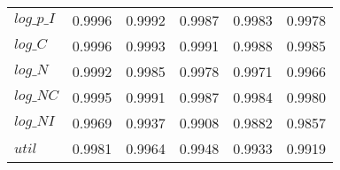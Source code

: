 \begin{center}
\begin{longtable}{lccccc}
$log\_p\_I  $	 & 	     0.9996	 & 	     0.9992	 & 	     0.9987	 & 	     0.9983	 & 	     0.9978 \\ 
$log\_C     $	 & 	     0.9996	 & 	     0.9993	 & 	     0.9991	 & 	     0.9988	 & 	     0.9985 \\ 
$log\_N     $	 & 	     0.9992	 & 	     0.9985	 & 	     0.9978	 & 	     0.9971	 & 	     0.9966 \\ 
$log\_NC    $	 & 	     0.9995	 & 	     0.9991	 & 	     0.9987	 & 	     0.9984	 & 	     0.9980 \\ 
$log\_NI    $	 & 	     0.9969	 & 	     0.9937	 & 	     0.9908	 & 	     0.9882	 & 	     0.9857 \\ 
${util}     $	 & 	     0.9981	 & 	     0.9964	 & 	     0.9948	 & 	     0.9933	 & 	     0.9919 \\ 
\end{longtable}
 \end{center}
